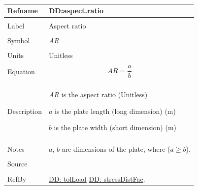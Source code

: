 \documentclass[12pt]{article}
\begin{document}
~\newline
\noindent \begin{minipage}{\textwidth}
\begin{tabular}{p{} p{}}
\toprule \textbf{Refname} & \textbf{DD:aspect.ratio}
\label{DD:aspect.ratio}
\\ \midrule \\
Label & Aspect ratio
\\ \midrule \\
Symbol & $AR$
\\ \midrule \\
Units & Unitless
\\ \midrule \\
Equation & \begin{dmath}
           AR=\frac{a}{b}
           \end{dmath}
\\ \midrule \\
Description & \begin{symbDescription}
              \item{$AR$ is the aspect ratio (Unitless)}
              \item{$a$ is the plate length (long dimension) (m)}
              \item{$b$ is the plate width (short dimension) (m)}
              \end{symbDescription}
\\ \midrule \\
Notes & $a$, $b$ are dimensions of the plate, where ($a\geq{}b$).
\\ \midrule \\
Source & \cite{astm2009}
\\ \midrule \\
RefBy & \hyperref[DD:tolLoad]{DD: tolLoad} \hyperref[DD:stressDistFac]{DD: stressDistFac}.
\\ \bottomrule \end{tabular}
\end{minipage}\\
~\newline
\end{document}
